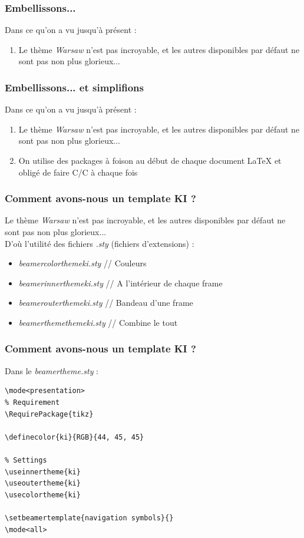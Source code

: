 \documentclass[handout]{beamer}
\begin{document}
\begin{frame}
\frametitle{Embellissons...}
Dans ce qu'on a vu jusqu'à présent :
\begin{enumerate}
	\item Le thème \textit{Warsaw} n'est pas incroyable, et les autres disponibles par défaut ne sont pas non plus glorieux...
\end{enumerate}
\end{frame}

\begin{frame}
\frametitle{Embellissons... et simplifions}
Dans ce qu'on a vu jusqu'à présent :
\begin{enumerate}
	\item Le thème \textit{Warsaw} n'est pas incroyable, et les autres disponibles par défaut ne sont pas non plus glorieux...
	\item On utilise des packages à foison au début de chaque document \LaTeX \vspace{1cm} et obligé de faire C/C à chaque fois
\end{enumerate}
\end{frame}

\begin{frame}
\frametitle{Comment avons-nous un template KI ?}
	Le thème \textit{Warsaw} n'est pas incroyable, et les autres disponibles par défaut ne sont pas non plus glorieux...\\
	D'où l'utilité des fichiers \textit{.sty} (fichiers d'extensions) :
	\begin{itemize}
		\item \textit{beamercolorthemeki.sty} // Couleurs
		\item \textit{beamerinnerthemeki.sty} // A l'intérieur de chaque frame
		\item \textit{beamerouterthemeki.sty} // Bandeau d'une frame
		\item \textit{beamerthemethemeki.sty} // Combine le tout
	\end{itemize}
\end{frame}

\begin{frame}[fragile=singleslide]
\frametitle{Comment avons-nous un template KI ?}
Dans le \textit{beamertheme.sty} :
\begin{verbatim}
\mode<presentation>
% Requirement
\RequirePackage{tikz}

\definecolor{ki}{RGB}{44, 45, 45}

% Settings
\useinnertheme{ki}
\useoutertheme{ki}
\usecolortheme{ki}

\setbeamertemplate{navigation symbols}{}
\mode<all>
\end{verbatim}
\end{frame}
\end{document}
